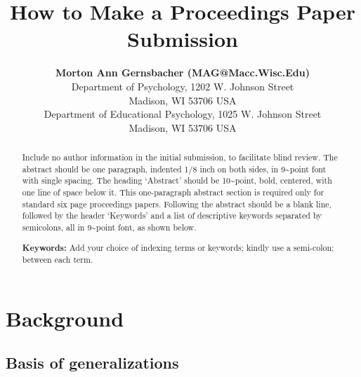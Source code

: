 \documentclass[10pt, letterpaper]{article}
\title{How to Make a Proceedings Paper Submission}
\author{{\large \bf Morton Ann Gernsbacher (MAG@Macc.Wisc.Edu)} \\ Department of Psychology, 1202 W. Johnson Street \\ Madison, WI 53706 USA \AND {\large \bf Sharon J.~Derry (SDJ@Macc.Wisc.Edu)} \\ Department of Educational Psychology, 1025 W. Johnson Street \\ Madison, WI 53706 USA}
\begin{document}
\maketitle

\begin{abstract}
Include no author information in the initial submission, to facilitate
blind review. The abstract should be one paragraph, indented 1/8 inch on
both sides, in 9\textasciitilde point font with single spacing. The
heading `Abstract' should be 10\textasciitilde point, bold, centered,
with one line of space below it. This one-paragraph abstract section is
required only for standard six page proceedings papers. Following the
abstract should be a blank line, followed by the header `Keywords' and a
list of descriptive keywords separated by semicolons, all in
9\textasciitilde point font, as shown below.

\textbf{Keywords:}
Add your choice of indexing terms or keywords; kindly use a semi-colon;
between each term.
\end{abstract}

\hypertarget{background}{%
\section{Background}\label{background}}

\hypertarget{basis-of-generalizations}{%
\subsection{Basis of generalizations}\label{basis-of-generalizations}}
\end{document}

